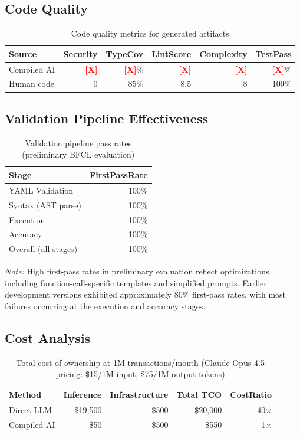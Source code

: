 \documentclass[11pt]{article}
\newcommand{\placeholder}[1]{\textcolor{red}{\textbf{[#1]}}}
\begin{document}
\subsection{Code Quality}

\begin{table}[ht]
\centering
\caption{Code quality metrics for generated artifacts}
\label{tab:quality-results}
\begin{tabular}{lrrrrr}
\toprule
Source & Security & TypeCov & LintScore & Complexity & TestPass \\
\midrule
Compiled AI & \placeholder{X} & \placeholder{X}\% & \placeholder{X} & \placeholder{X} & \placeholder{X}\% \\
Human code & 0 & 85\% & 8.5 & 8 & 100\% \\
\bottomrule
\end{tabular}
\end{table}

\subsection{Validation Pipeline Effectiveness}

\begin{table}[ht]
\centering
\caption{Validation pipeline pass rates (preliminary BFCL evaluation)}
\label{tab:validation-results}
\begin{tabular}{lr}
\toprule
Stage & FirstPassRate \\
\midrule
YAML Validation & 100\% \\
Syntax (AST parse) & 100\% \\
Execution & 100\% \\
Accuracy & 100\% \\
\midrule
Overall (all stages) & 100\% \\
\bottomrule
\end{tabular}
\end{table}

\noindent\textit{Note:} High first-pass rates in preliminary evaluation reflect optimizations including function-call-specific templates and simplified prompts. Earlier development versions exhibited approximately 80\% first-pass rates, with most failures occurring at the execution and accuracy stages.

\subsection{Cost Analysis}

\begin{table}[ht]
\centering
\caption{Total cost of ownership at 1M transactions/month (Claude Opus 4.5 pricing: \$15/1M input, \$75/1M output tokens)}
\label{tab:cost-results}
\begin{tabular}{lrrrr}
\toprule
Method & Inference & Infrastructure & Total TCO & CostRatio \\
\midrule
Direct LLM & \$19,500 & \$500 & \$20,000 & 40$\times$ \\
Compiled AI & \$50 & \$500 & \$550 & 1$\times$ \\
\bottomrule
\end{tabular}
\end{table}
\end{document}
